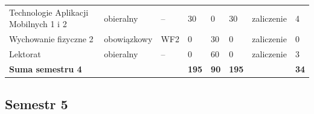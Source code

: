 \documentclass[12pt,a4paper]{article}
\begin{document}
{\begin{longtable}{m{5.0cm}m{1.9cm}m{0.75cm}m{0.85cm}m{0.85cm}m{0.85cm}m{1.45cm}m{0.9cm}}
\rowcolor{tableElective} Technologie Aplikacji Mobilnych 1 i 2 & {\scriptsize obieralny} & -- & 30 & 0 & 30 & {\scriptsize zaliczenie} & 4 \\
\rowcolor{tableRowLight} Wychowanie fizyczne 2 & {\scriptsize obowiązkowy} & WF2 & 0 & 30 & 0 & {\scriptsize zaliczenie} & 0 \\
\rowcolor{tableElective} Lektorat & {\scriptsize obieralny} & -- & 0 & 60 & 0 & {\scriptsize zaliczenie} & 3 \\
\midrule[\heavyrulewidth]
\rowcolor{tableSummary} \textbf{Suma semestru 4} & & & \textbf{195} & \textbf{90} & \textbf{195} & & \textbf{34} \\
\bottomrule
\end{longtable}}

\clearpage
\subsection*{Semestr 5}
\end{document}
